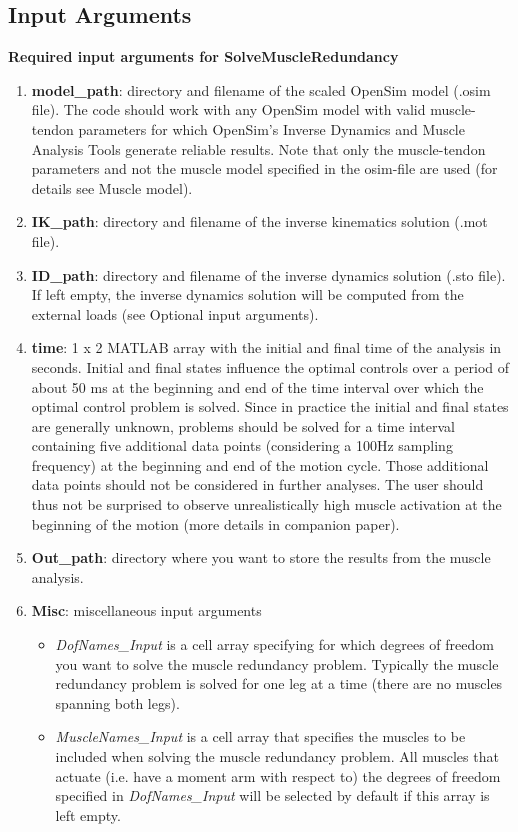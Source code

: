 \documentclass[a4paper,oneside,11pt]{article}
\begin{document}
\subsection{Input Arguments}


\textbf{Required input arguments for SolveMuscleRedundancy}
\begin{enumerate}
	\item \textbf{model_path}: directory and filename of the scaled OpenSim model (.osim file). The code should work with any OpenSim model with valid muscle-tendon parameters for which OpenSim's Inverse Dynamics and Muscle Analysis Tools generate reliable results. Note that only the muscle-tendon parameters and not the muscle model specified in the osim-file are used (for details see Muscle model).
	\item \textbf{IK_path}: directory and filename of the inverse kinematics solution (.mot file).
	\item \textbf{ID_path}: directory and filename of the inverse dynamics solution  (.sto file). If left empty, the inverse dynamics solution will be computed from the external loads (see Optional input arguments).
	\item \textbf{time}: 1 x 2 MATLAB array with the initial and final time of the analysis in seconds. Initial and final states influence the optimal controls over a period of about 50 ms at the beginning and end of the time interval over which the optimal control problem is solved. Since in practice the initial and final states are generally unknown, problems should be solved for a time interval containing five additional data points (considering a 100Hz sampling frequency) at the beginning and end of the motion cycle. Those additional data points should not be considered in further analyses. The user should thus not be surprised to observe unrealistically high muscle activation at the beginning of the motion (more details in companion paper).
	
	\item \textbf{Out_path}: directory where you want to store the results from the muscle analysis.
	\item \textbf{Misc}: miscellaneous input arguments
	\begin{itemize}
		\item \textit{DofNames_Input}  is a cell array specifying for which degrees of freedom you want to solve the muscle redundancy problem. Typically the muscle redundancy problem is solved for one leg at a time (there are no muscles spanning both legs).
		\item \textit{MuscleNames_Input} is a cell array that specifies the muscles to be included when solving the muscle redundancy problem. All muscles that actuate (i.e. have a moment arm with respect to) the degrees of freedom specified in \textit{DofNames_Input} will be selected by default if this array is left empty.
	\end{itemize}
\end{enumerate}
\end{document}
